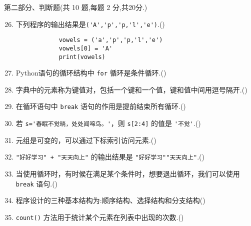 \documentclass[11pt]{ctexart}
\begin{document}
    \newpage
    {\noindent\heiti 第二部分、判断题(共 10 题,每题 2 分,共20分.)}
    \begin{enumerate}
        \setcounter{enumi}{25}
        \item 下列程序的输出结果是\lstinline!('A','p','p,'l','e')!.(\qquad)
        \begin{lstlisting}
            vowels = ('a','p','p,'l','e')
            vowels[0] = 'A'
            print(vowels)
        \end{lstlisting}

        \item Python语句的循环结构中 \lstinline{for} 循环是条件循环.(\qquad)
        
        \item 字典中的元素称为键值对，包括一个键和一个值，键和值中间用逗号隔开.(\qquad)
  
        \item 在循环语句中 \lstinline{break} 语句的作用是提前结束所有循环.(\qquad)
        
        \item 若 \lstinline!s='春眠不觉晓，处处闻啼鸟。'!，则 \lstinline!s[2:4]! 的值是 \lstinline{'不觉'}.(\qquad)
        
        \item 元组是可变的，可以通过下标索引访问元素.(\qquad)
        
        \item \lstinline!"好好学习" + "天天向上"! 的输出结果是 \lstinline!"好好学习""天天向上"!.(\qquad)
        
        \item 当使用循环时，有时候在满足某个条件时，想要退出循环，我们可以使用 \lstinline!break! 语句.(\qquad)
        
        \item 程序设计的三种基本结构为:顺序结构、选择结构和分支结构(\qquad)
        
        \item \lstinline!count()! 方法用于统计某个元素在列表中出现的次数.(\qquad)
    \end{enumerate}
\end{document}
